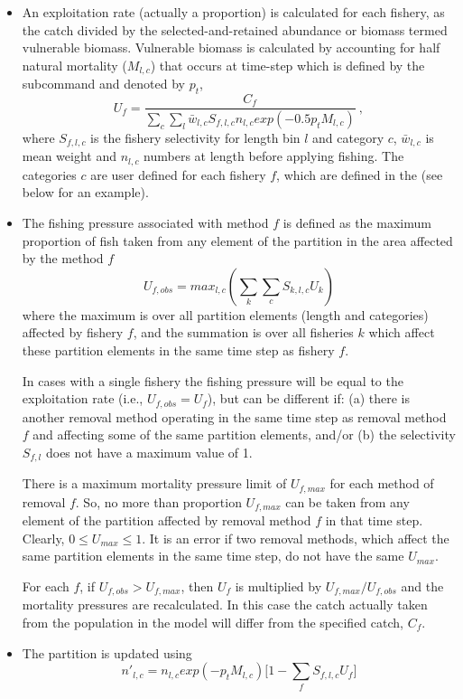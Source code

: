 \begin{itemize}
	\item An exploitation rate (actually a proportion) is calculated for each fishery, as the catch divided by the selected-and-retained abundance or biomass termed vulnerable biomass. Vulnerable biomass is calculated by accounting for half natural mortality (\(M_{l,c}\)) that occurs at time-step which is defined by the subcommand  and denoted by \(p_t\),
	$$U_{f} = \frac{C_f}{\sum\limits_{c}\sum\limits_l \bar{w}_{l,c} S_{f,l,c} n_{l,c} exp(-0.5 p_t M_{l,c})} \ ,$$
	where \(S_{f,l,c}\) is the fishery selectivity for length bin \(l\) and category \(c\), \(\bar{w}_{l,c}\) is mean weight and \(n_{l,c}\) numbers at length before applying fishing. The categories \(c\) are user defined for each fishery \(f\), which are defined in the  (see below for an example).
	\item The fishing pressure associated with method $f$ is defined as the maximum proportion of fish taken from any element of the partition in the area affected by the method $f$
	$$ U_{f,obs} = max_{l,c}(\sum\limits_k\sum\limits_c S_{k,l,c} U_k) $$
	where the maximum is over all partition elements (length and categories) affected by fishery $f$, and the summation is over all fisheries $k$ which affect these partition elements in the same time step as fishery $f$.
	
	In cases with a single fishery the fishing pressure will be equal to the exploitation rate (i.e., $U_{f,obs} = U_f$), but can be different if: (a) there is another removal method operating in the same time step as removal method $f$ and affecting some of the same partition elements, and/or (b) the selectivity $S_{f,l}$ does not have a maximum value of 1.
	
	There is a maximum mortality pressure limit of $U_{f,max}$ for each method of removal $f$. So, no more than proportion $U_{f,max}$ can be taken from any element of the partition affected by removal method $f$ in that time step. Clearly, $0 \leq U_{max} \leq 1$. It is an error if two removal methods, which affect the same partition elements in the same time step, do not have the same $U_{max}$.
	
	For each $f$, if $U_{f,obs} > U_{f,max}$, then $U_f$ is multiplied by $U_{f,max}/U_{f,obs}$ and the mortality pressures are recalculated. In this case the catch actually taken from the population in the model will differ from the specified catch, $C_f$.
	
	\item The partition is updated using
	$$ n'_{l,c} = n_{l,c} exp(-p_t M_{l,c})\big[1 - \sum_f S_{f,l,c} U_{f} \big] $$
\end{itemize}

